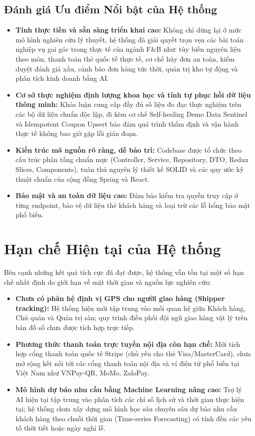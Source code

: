 \documentclass{uetgraduation}
\begin{document}
\subsection{Đánh giá Ưu điểm Nổi bật của Hệ thống}
\begin{itemize}
    \item \textbf{Tính thực tiễn và sẵn sàng triển khai cao:} Không chỉ dừng lại ở mức mô hình nghiên cứu lý thuyết, hệ thống đã giải quyết trọn vẹn các bài toán nghiệp vụ gai góc trong thực tế của ngành F\&B như: tùy biến nguyên liệu theo món, thanh toán thẻ quốc tế thực tế, cơ chế hủy đơn an toàn, kiểm duyệt đánh giá xấu, cảnh báo đơn hàng tức thời, quản trị kho tự động và phân tích kinh doanh bằng AI.
    \item \textbf{Cơ sở thực nghiệm định lượng khoa học và tính tự phục hồi dữ liệu thông minh:} Khóa luận cung cấp đầy đủ số liệu đo đạc thực nghiệm trên các bộ dữ liệu chuẩn độc lập, đi kèm cơ chế Self-healing Demo Data Sentinel và Idempotent Coupon Upsert bảo đảm quá trình thẩm định và vận hành thực tế không bao giờ gặp lỗi gián đoạn.
    \item \textbf{Kiến trúc mã nguồn rõ ràng, dễ bảo trì:} Codebase được tổ chức theo cấu trúc phân tầng chuẩn mực (Controller, Service, Repository, DTO, Redux Slices, Components), tuân thủ nguyên lý thiết kế SOLID và các quy ước kỹ thuật chuẩn của cộng đồng Spring và React.
    \item \textbf{Bảo mật và an toàn dữ liệu cao:} Đảm bảo kiểm tra quyền truy cập ở từng endpoint, bảo vệ dữ liệu thẻ khách hàng và loại trừ các lỗ hổng bảo mật phổ biến.
\end{itemize}

\section{Hạn chế Hiện tại của Hệ thống}
Bên cạnh những kết quả tích cực đã đạt được, hệ thống vẫn tồn tại một số hạn chế nhất định do giới hạn về mặt thời gian và nguồn lực nghiên cứu:
\begin{itemize}
    \item \textbf{Chưa có phân hệ định vị GPS cho người giao hàng (Shipper tracking):} Hệ thống hiện mới tập trung vào mối quan hệ giữa Khách hàng, Chủ quán và Quản trị sàn; quy trình điều phối đội ngũ giao hàng vật lý trên bản đồ số chưa được tích hợp trực tiếp.
    \item \textbf{Phương thức thanh toán trực tuyến nội địa còn hạn chế:} Mới tích hợp cổng thanh toán quốc tế Stripe (chủ yếu cho thẻ Visa/MasterCard), chưa mở rộng kết nối tới các cổng thanh toán nội địa và ví điện tử phổ biến tại Việt Nam như VNPay-QR, MoMo, ZaloPay.
    \item \textbf{Mô hình dự báo nhu cầu bằng Machine Learning nâng cao:} Trợ lý AI hiện tại tập trung vào phân tích các chỉ số lịch sử và thời gian thực hiện tại; hệ thống chưa xây dựng mô hình học sâu chuyên sâu dự báo nhu cầu khách hàng theo chuỗi thời gian (Time-series Forecasting) có tính đến các yếu tố thời tiết hoặc ngày nghỉ lễ.
\end{itemize}
\end{document}

